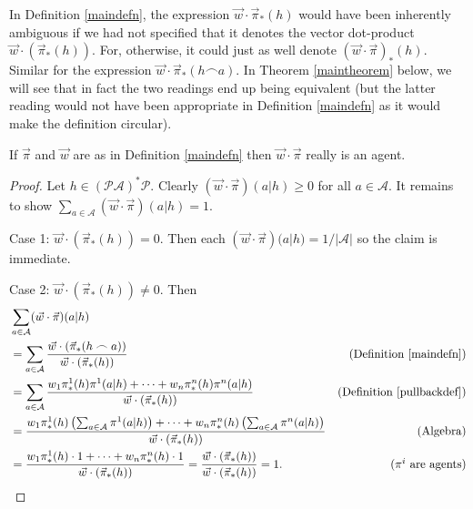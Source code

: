\documentclass[runningheads]{llncs}
\begin{document}
\begin{remark}
\label{ambiguityremark}
    In Definition \ref{maindefn},
    the expression $\vec w\cdot \vec\pi_*(h)$ would have been inherently
    ambiguous if we had not specified that it denotes
    the vector dot-product $\vec w\cdot (\vec\pi_*(h))$.
    For, otherwise, it could just as well denote
    $(\vec w\cdot \vec\pi)_*(h)$. Similar for the expression
    $\vec w\cdot \vec\pi_*(h\frown a)$.
    In Theorem \ref{maintheorem} below, we will see that in fact
    the two readings end up being equivalent
    (but the latter reading would not have been appropriate
    in Definition \ref{maindefn} as it would make the definition circular).
\end{remark}

\begin{lemma}
    If $\vec\pi$ and $\vec w$ are as in Definition \ref{maindefn}
    then $\vec w\cdot\vec\pi$ really is an agent.
\end{lemma}

\begin{proof}
    Let $h\in(\mathcal P\mathcal A)^*\mathcal P$.
    Clearly $(\vec w\cdot\vec\pi)(a|h)\geq 0$ for all $a\in\mathcal A$.
    It remains to show
    $\sum_{a\in\mathcal A}(\vec w\cdot\vec\pi)(a|h)=1$.

    Case 1: $\vec w\cdot (\vec\pi_*(h))=0$. Then
    each $(\vec w\cdot\vec\pi)(a|h)=1/|\mathcal A|$ so the
    claim is immediate.

    Case 2: $\vec w\cdot (\vec\pi_*(h))\not=0$. Then
    \begin{align*}
        &{} \sum_{a\in\mathcal A}(\vec w\cdot\vec\pi)(a|h)\\
            &= \sum_{a\in\mathcal A}
                \frac{\vec w\cdot (\vec\pi_*(h\frown a))}{\vec w\cdot (\vec\pi_*(h))}
                &\mbox{(Definition \ref{maindefn})}\\
            &= \sum_{a\in\mathcal A}
                \frac
                {w_1\pi^1_*(h)\pi^1(a|h)+\cdots+w_n\pi^n_*(h)\pi^n(a|h)}
                {\vec w\cdot(\vec\pi_*(h))}
                &\mbox{(Definition \ref{pullbackdef})}\\
            &= \frac{
                w_1\pi^1_*(h)\left(\mbox{$\sum_{a\in\mathcal A}\pi^1(a|h)$}\right)
                +\cdots+
                w_n\pi^n_*(h)\left(\mbox{$\sum_{a\in\mathcal A}\pi^n(a|h)$}\right)
                }
                {\vec w\cdot (\vec\pi_*(h))}
                &\mbox{(Algebra)}\\
            &= \frac
                {w_1\pi^1_*(h)\cdot 1 + \cdots + w_n\pi^n_*(h)\cdot1}
                {\vec w\cdot (\vec\pi_*(h))}
                =\frac{\vec w\cdot (\vec\pi_*(h))}{\vec w\cdot (\vec\pi_*(h))}=1.
                &\mbox{($\pi^i$ are agents)}
    \end{align*}
\end{proof}
\end{document}
